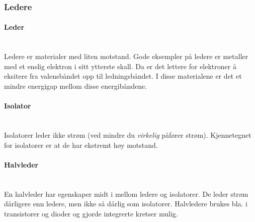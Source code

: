 \subsubsection{Ledere}
\paragraph{Leder} \mbox{} \\
Ledere er materialer med liten motstand.
Gode eksempler på ledere er metaller med et enslig elektron i sitt ytterste skall.
Da er det lettere for elektroner å eksitere fra valensbåndet opp til ledningsbåndet.
I disse materialene er det et mindre energigap mellom disse energibåndene.

\paragraph{Isolator} \mbox{} \\
Isolatorer leder ikke strøm (ved mindre du \emph{virkelig} påfører strøm).
Kjennetegnet for isolatorer er at de har ekstremt høy motstand.

\paragraph{Halvleder} \mbox{} \\
En halvleder har egenskaper midt i mellom ledere og isolatorer.
De leder strøm dårligere enn ledere, men ikke så dårlig som isolatorer.
Halvledere brukes bla. i transistorer og dioder og gjorde integrerte kretser mulig.
